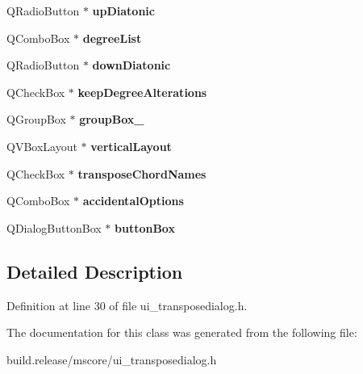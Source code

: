 \begin{DoxyCompactItemize}
\mbox{\label{class_ui___transpose_dialog_base_a8cc37d201b63d3710230106ba112859c}} 
Q\+Radio\+Button $\ast$ {\bfseries up\+Diatonic}
\item 
\mbox{\label{class_ui___transpose_dialog_base_a51ca1b0dc713582b7f9eae850d5e145b}} 
Q\+Combo\+Box $\ast$ {\bfseries degree\+List}
\item 
\mbox{\label{class_ui___transpose_dialog_base_af58221916577d3c0d7a59e1334f94160}} 
Q\+Radio\+Button $\ast$ {\bfseries down\+Diatonic}
\item 
\mbox{\label{class_ui___transpose_dialog_base_a67d87ac573b98b57cf655a7d588ec69d}} 
Q\+Check\+Box $\ast$ {\bfseries keep\+Degree\+Alterations}
\item 
\mbox{\label{class_ui___transpose_dialog_base_a31a6b315655aba7fa300ae542b18b36a}} 
Q\+Group\+Box $\ast$ {\bfseries group\+Box\+\_}
\item 
\mbox{\label{class_ui___transpose_dialog_base_a453978143f18afa381eefddfb50218b1}} 
Q\+V\+Box\+Layout $\ast$ {\bfseries vertical\+Layout}
\item 
\mbox{\label{class_ui___transpose_dialog_base_a2d52fff88559b60b29a54c145eb10519}} 
Q\+Check\+Box $\ast$ {\bfseries transpose\+Chord\+Names}
\item 
\mbox{\label{class_ui___transpose_dialog_base_a4271dfef0d12c15b943b27c0cd866137}} 
Q\+Combo\+Box $\ast$ {\bfseries accidental\+Options}
\item 
\mbox{\label{class_ui___transpose_dialog_base_a352400ad93aee107e910392f6f18a892}} 
Q\+Dialog\+Button\+Box $\ast$ {\bfseries button\+Box}
\end{DoxyCompactItemize}


\subsection{Detailed Description}


Definition at line 30 of file ui\+\_\+transposedialog.\+h.



The documentation for this class was generated from the following file\+:\begin{DoxyCompactItemize}
\item 
build.\+release/mscore/ui\+\_\+transposedialog.\+h\end{DoxyCompactItemize}
